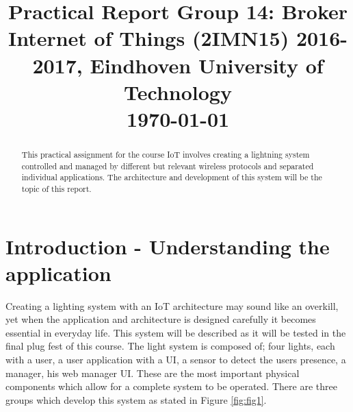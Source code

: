 \documentclass[conference]{IEEEtran}
\begin{document}
\title{Practical Report Group 14: Broker\\ {\fontsize{13}{0}\selectfont Internet of Things (2IMN15) 2016-2017, Eindhoven University of Technology} \\ {\fontsize{13}{0}\selectfont \today }}

\author{
	\and
	}
\maketitle

\IEEEpeerreviewmaketitle


\begin{abstract}
	This practical assignment for the course IoT involves creating a lightning system controlled and managed by different but relevant wireless protocols and separated individual applications. The architecture and development of this system will be the topic of this report.\\
	
\end{abstract}


\section{Introduction - Understanding the application}

Creating a lighting system with an IoT architecture may sound like an overkill, yet when the application and architecture is designed carefully it becomes essential in everyday life. This system will be described as it will be tested in the final plug fest of this course. The light system is composed of; four lights, each with a user, a user application with a UI, a sensor to detect the users presence, a manager, his web manager UI. These are the most important physical components which allow for a complete system to be operated. There are three groups which develop this system as stated in Figure \ref{fig:fig1}.
\end{document}
